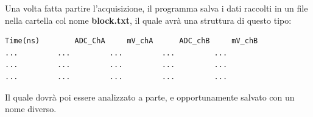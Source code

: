 \documentclass[a4paper]{article}
\begin{document}
\noindent Una volta fatta partire l'acquisizione, il programma salva i dati raccolti in un file nella cartella col nome \textbf{block.txt}, il quale avrà una struttura di questo tipo:
\begin{tcolorbox}
\begin{Verbatim}[tabsize = 4]
Time(ns)		ADC_ChA		mV_chA		ADC_chB		mV_chB
...			...			...			...			...
...			...			...			...			...
...			...			...			...			...
\end{Verbatim}
\end{tcolorbox}

Il quale dovrà poi essere analizzato a parte, e opportunamente salvato con un nome diverso.
 
\end{document}
